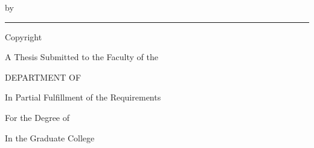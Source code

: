\thispagestyle{empty}
\begin{center}
\vspace*{1.0in}

{\large \MakeUppercase{\ThesisTitle} \par}
\vspace{0.75in}

by\par
\vspace{0.25in}

\ThesisAuthor\par
\vspace{0.5in}

\rule{3in}{0.4pt}\par
\vspace{2pt}

{\small Copyright \textcopyright\ \ThesisAuthor\ \ThesisYear\par}
\vfill

A Thesis Submitted to the Faculty of the\par
\vspace{0.1in}
\MakeUppercase{Department of \ThesisProgram}\par
\vspace{0.1in}
In Partial Fulfillment of the Requirements\par
For the Degree of\par
\vspace{0.1in}
\MakeUppercase{\ThesisDegree}\par
\vspace{0.1in}
In the Graduate College\par
\vspace{0.1in}
\ThesisUniversity\par
\vspace{0.5in}

\ThesisYear\par
\end{center}

